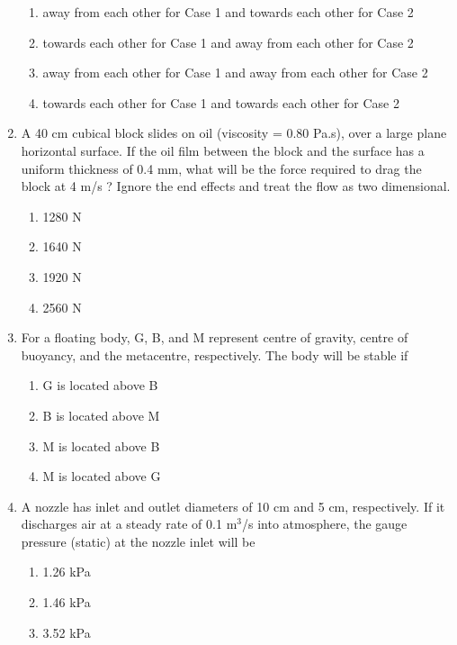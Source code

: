 \documentclass[journal]{IEEEtran}
\begin{document}
\begin{enumerate}
\begin{figure}[!ht]
\centering
\resizebox{0.5\textwidth}{!}{%

}%
\end{figure}
 \begin{enumerate}
    \item away from each other for Case 1 and towards each other for Case 2
    \item towards each other for Case 1 and away from each other for Case 2
    \item away from each other for Case 1 and away from each other for Case 2
    \item towards each other for Case 1 and towards each other for Case 2 \\
 \end{enumerate}
\item A 40 cm cubical block slides on oil (viscosity = 0.80 Pa.s), over a large plane horizontal surface. If the oil film between the block and the surface has a uniform thickness of 0.4 mm, what will be the force required to drag the block at 4 m/s ? Ignore the end effects and treat the flow as two dimensional.
\begin{enumerate}
     \item 1280 N
     \item 1640 N
     \item 1920 N
     \item 2560 N \\
 \end{enumerate}
\item For a floating body, G, B, and M represent centre of gravity, centre of buoyancy, and the metacentre, respectively. The body will be stable if
\begin{enumerate}
    \item G is located above B
    \item B is located above M
    \item M is located above B
    \item M is located above G \\
\end{enumerate}
\item A nozzle has inlet and outlet diameters of 10 cm and 5 cm, respectively. If it discharges air at a steady rate of 0.1 $\text{m}^3$/s into atmosphere, the gauge pressure (static) at the nozzle inlet will be
\begin{enumerate}
    \item 1.26 kPa
    \item 1.46 kPa
    \item 3.52 kPa

\end{enumerate}
\end{enumerate}
\end{document}
